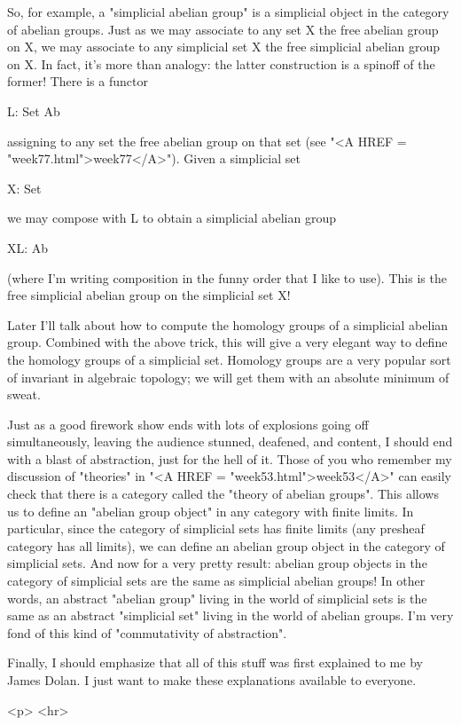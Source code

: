 So, for example, a "simplicial abelian group" is a simplicial object
in the category of abelian groups.   Just as we may associate to any
set X the free abelian group on X, we may associate to any simplicial
set X the free simplicial abelian group on X.  In fact, it's more than 
analogy: the latter construction is a spinoff of the former!  There
is a functor 

                       L: Set \to  Ab

assigning to any set the free abelian group on that set (see "<A HREF = "week77.html">week77</A>").
Given a simplicial set

                       X: \Delta  \to  Set

we may compose with L to obtain a simplicial abelian group

                       XL: \Delta  \to  Ab

(where I'm writing composition in the funny order that I like to use).  
This is the free simplicial abelian group on the simplicial set X!

Later I'll talk about how to compute the homology groups of a simplicial
abelian group.  Combined with the above trick, this will give a very 
elegant way to define the homology groups of a simplicial set.  Homology
groups are a very popular sort of invariant in algebraic topology; we
will get them with an absolute minimum of sweat.

Just as a good firework show ends with lots of explosions going off
simultaneously, leaving the audience stunned, deafened, and content, I
should end with a blast of abstraction, just for the hell of it.  Those
of you who remember my discussion of "theories" in "<A HREF = "week53.html">week53</A>" can easily
check that there is a category called the "theory of abelian groups".
This allows us to define an "abelian group object" in any category with
finite limits.  In particular, since the category of simplicial sets has
finite limits (any presheaf category has all limits), we can define an
abelian group object in the category of simplicial sets.  And now for a
very pretty result: abelian group objects in the category of simplicial
sets are the same as simplicial abelian groups!  In other words, an
abstract "abelian group" living in the world of simplicial sets is the
same as an abstract "simplicial set" living in the world of abelian
groups.  I'm very fond of this kind of "commutativity of abstraction".

Finally, I should emphasize that all of this stuff was first explained
to me by James Dolan.  I just want to make these explanations available
to everyone.








<p> <hr>



